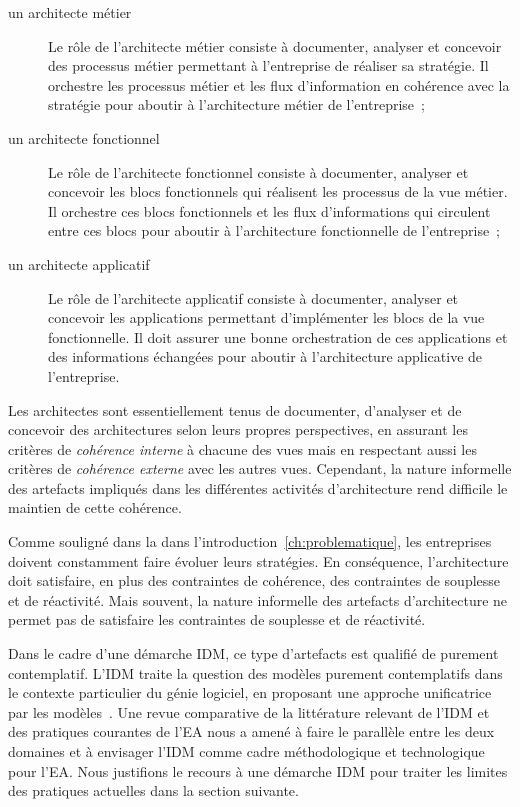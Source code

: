 \begin{description}
    \item[un architecte métier]
    Le rôle de l'architecte métier consiste à documenter, analyser et concevoir
    des processus métier permettant à l'entreprise de réaliser sa stratégie.
    Il orchestre les processus métier et les flux d'information en cohérence
    avec la stratégie pour aboutir à l'architecture métier de l'entreprise~;

    \item[un architecte fonctionnel]
    Le rôle de l'architecte fonctionnel consiste à documenter, analyser et
    concevoir les blocs fonctionnels qui réalisent les processus de
    la vue métier. Il orchestre ces blocs fonctionnels et les flux d'informations
    qui circulent entre ces blocs pour aboutir à l'architecture fonctionnelle
    de l'entreprise~;

    \item[un architecte applicatif]
    Le rôle de l'architecte applicatif consiste à documenter, analyser
    et concevoir les applications permettant d'implémenter les blocs
    de la vue fonctionnelle. Il doit assurer une bonne orchestration de ces
    applications et des informations échangées pour aboutir à l'architecture
    applicative de l'entreprise.
\end{description}

Les architectes sont essentiellement tenus de documenter, d'analyser et de
concevoir des architectures selon leurs propres perspectives, en assurant les
critères de \emph{cohérence interne} à chacune des vues mais en respectant
aussi les critères de \emph{cohérence externe} avec les autres vues. Cependant,
la nature informelle des artefacts impliqués dans les différentes activités
d’architecture rend difficile le maintien de cette cohérence.

Comme souligné dans la dans l'introduction~\ref{ch:problematique}, les
entreprises doivent constamment faire évoluer leurs stratégies. En conséquence,
l'architecture doit satisfaire, en plus des contraintes de cohérence, des
contraintes de souplesse et de réactivité. Mais souvent, la nature informelle
des artefacts d’architecture ne permet pas de satisfaire les contraintes de
souplesse et de réactivité.

Dans le cadre d'une démarche IDM, ce type d'artefacts est qualifié de purement
contemplatif. L'IDM traite la question des modèles purement contemplatifs dans
le contexte particulier du génie logiciel, en proposant une approche
unificatrice par les modèles~\cite{jezequel2006genie}. Une revue comparative
de la littérature relevant de l'IDM et des pratiques courantes de l'EA nous a
amené à faire le parallèle entre les deux domaines et
à envisager l'IDM comme cadre méthodologique et technologique pour l'EA.
Nous justifions le recours à une démarche IDM  pour traiter les
limites  des pratiques actuelles dans la section suivante.

